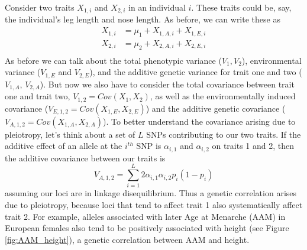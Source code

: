Consider two traits $X_{1,i}$ and $X_{2,i}$ in an individual $i$. These traits could be,
say, the individual's leg length and nose length. As before, we can write
these as 
\begin{eqnarray}
X_{1,i} &= \mu_1+ X_{1,A,i} + X_{1,E,i}  \nonumber \\
X_{2,i} &= \mu_2 +X_{2,A,i} + X_{2,E,i} \nonumber \\
\end{eqnarray}
As before we can talk about the total phenotypic variance ($V_1,V_2$),
environmental variance  ($V_{1,E}$ and $V_{2,E}$), and the additive genetic variance for trait one and two ($V_{1,A}$, $V_{2,A}$). But now we also have to consider the 
total covariance between trait one and trait two, $V_{1,2}=Cov(X_{1},X_{2})$, as well as the environmentally induced covariance ($V_{E,1,2}=Cov(X_{1,E}
,X_{2,E} )$) and the additive genetic covariance ($V_{A,1,2}
=Cov(X_{1,A} ,X_{2,A} )$). To better understand the covariance arising due to pleiotropy, let's think about a set of $L$ SNPs contributing to our two traits. If the additive effect of an allele at the $i^{th}$ SNP is $\alpha_{i,1}$ and $\alpha_{i,2}$ on traits 1 and 2, then the additive covariance between our traits is
\begin{equation}
V_{A,1,2} = \sum_{i=1}^L 2\alpha_{i,1}\alpha_{i,2} p_i(1-p_i)
\end{equation}
assuming our loci are in linkage disequilibrium. Thus a genetic correlation arises due to pleiotropy, because loci that tend to affect trait 1 also systematically affect trait 2. For example, alleles associated with later Age at Menarche (AAM) in European females also tend to be positively associated with height (see Figure \ref{fig:AAM_height}),  a genetic correlation between AAM and height. 


